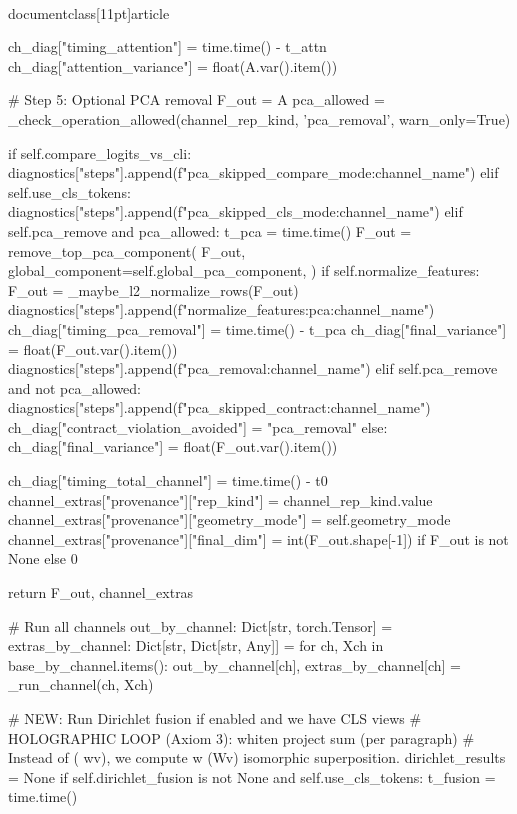 \\documentclass[11pt]{article}
\begin{document}
\begin{CodeBlock}
                ch_diag["timing_attention"] = time.time() - t_attn
                ch_diag["attention_variance"] = float(A.var().item())

            # Step 5: Optional PCA removal
            F_out = A
            pca_allowed = _check_operation_allowed(channel_rep_kind, 'pca_removal', warn_only=True)
            
            if self.compare_logits_vs_cli:
                diagnostics["steps"].append(f"pca_skipped_compare_mode:{channel_name}")
            elif self.use_cls_tokens:
                diagnostics["steps"].append(f"pca_skipped_cls_mode:{channel_name}")
            elif self.pca_remove and pca_allowed:
                t_pca = time.time()
                F_out = remove_top_pca_component(
                    F_out,
                    global_component=self.global_pca_component,
                )
                if self.normalize_features:
                    F_out = _maybe_l2_normalize_rows(F_out)
                    diagnostics["steps"].append(f"normalize_features:pca:{channel_name}")
                ch_diag["timing_pca_removal"] = time.time() - t_pca
                ch_diag["final_variance"] = float(F_out.var().item())
                diagnostics["steps"].append(f"pca_removal:{channel_name}")
            elif self.pca_remove and not pca_allowed:
                diagnostics["steps"].append(f"pca_skipped_contract:{channel_name}")
                ch_diag["contract_violation_avoided"] = "pca_removal"
            else:
                ch_diag["final_variance"] = float(F_out.var().item())

            ch_diag["timing_total_channel"] = time.time() - t0
            channel_extras["provenance"]["rep_kind"] = channel_rep_kind.value
            channel_extras["provenance"]["geometry_mode"] = self.geometry_mode
            channel_extras["provenance"]["final_dim"] = int(F_out.shape[-1]) if F_out is not None else 0
            
            return F_out, channel_extras

        # Run all channels
        out_by_channel: Dict[str, torch.Tensor] = {}
        extras_by_channel: Dict[str, Dict[str, Any]] = {}
        for ch, Xch in base_by_channel.items():
            out_by_channel[ch], extras_by_channel[ch] = _run_channel(ch, Xch)
        
        # NEW: Run Dirichlet fusion if enabled and we have CLS views
        # HOLOGRAPHIC LOOP (Axiom 3): whiten  project  sum (per paragraph)
        # Instead of ( wv), we compute  w (Wv)  isomorphic superposition.
        dirichlet_results = None
        if self.dirichlet_fusion is not None and self.use_cls_tokens:
            t_fusion = time.time()


\end{CodeBlock}
\end{document}
